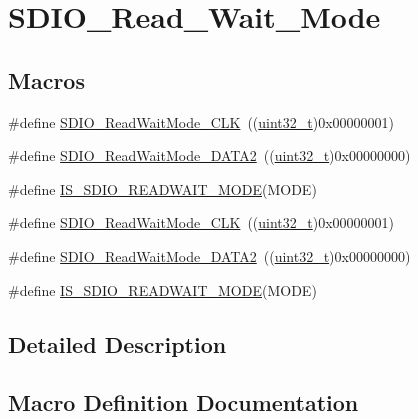 \hypertarget{group___s_d_i_o___read___wait___mode}{}\section{S\+D\+I\+O\+\_\+\+Read\+\_\+\+Wait\+\_\+\+Mode}
\label{group___s_d_i_o___read___wait___mode}
\subsection*{Macros}
\begin{DoxyCompactItemize}
\item 
\#define \hyperlink{group___s_d_i_o___read___wait___mode_ga5d73b50fed8b2589f337a6301f22f41c}{S\+D\+I\+O\+\_\+\+Read\+Wait\+Mode\+\_\+\+C\+LK}~((\hyperlink{_p_e___types_8h_a33594304e786b158f3fb30289278f5af}{uint32\+\_\+t})0x00000001)
\item 
\#define \hyperlink{group___s_d_i_o___read___wait___mode_ga3d6952d82468b49dcc7abd5b9e02039f}{S\+D\+I\+O\+\_\+\+Read\+Wait\+Mode\+\_\+\+D\+A\+T\+A2}~((\hyperlink{_p_e___types_8h_a33594304e786b158f3fb30289278f5af}{uint32\+\_\+t})0x00000000)
\item 
\#define \hyperlink{group___s_d_i_o___read___wait___mode_ga35144093f5b3553a62c2248896eead4d}{I\+S\+\_\+\+S\+D\+I\+O\+\_\+\+R\+E\+A\+D\+W\+A\+I\+T\+\_\+\+M\+O\+DE}(M\+O\+DE)
\item 
\#define \hyperlink{group___s_d_i_o___read___wait___mode_ga5d73b50fed8b2589f337a6301f22f41c}{S\+D\+I\+O\+\_\+\+Read\+Wait\+Mode\+\_\+\+C\+LK}~((\hyperlink{_p_e___types_8h_a33594304e786b158f3fb30289278f5af}{uint32\+\_\+t})0x00000001)
\item 
\#define \hyperlink{group___s_d_i_o___read___wait___mode_ga3d6952d82468b49dcc7abd5b9e02039f}{S\+D\+I\+O\+\_\+\+Read\+Wait\+Mode\+\_\+\+D\+A\+T\+A2}~((\hyperlink{_p_e___types_8h_a33594304e786b158f3fb30289278f5af}{uint32\+\_\+t})0x00000000)
\item 
\#define \hyperlink{group___s_d_i_o___read___wait___mode_ga35144093f5b3553a62c2248896eead4d}{I\+S\+\_\+\+S\+D\+I\+O\+\_\+\+R\+E\+A\+D\+W\+A\+I\+T\+\_\+\+M\+O\+DE}(M\+O\+DE)
\end{DoxyCompactItemize}


\subsection{Detailed Description}


\subsection{Macro Definition Documentation}
